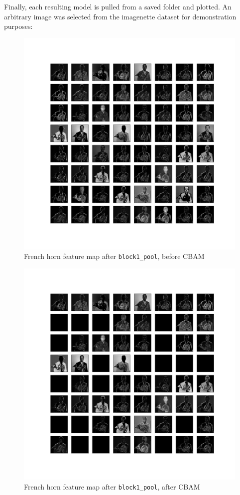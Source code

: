 \documentclass{article}
\begin{document}
Finally, each resulting model is pulled from a saved folder and plotted.
An arbitrary image was selected from the imagenette dataset for demonstration purposes:

\begin{figure}[H]
    \centering
    \includegraphics[width=6in]{csci-8920/hw-4/images/horn-pre-CBAM-3-block1_pool.png}
    \caption{French horn feature map after \lstinline{block1_pool}, before CBAM}
    \label{fig:horn_1_pre}
\end{figure}

\begin{figure}[H]
    \centering
    \includegraphics[width=6in]{csci-8920/hw-4/images/horn-post-CBAM-3-block1_pool.png}
    \caption{French horn feature map after \lstinline{block1_pool}, after CBAM}
    \label{fig:horn_1_post}
\end{figure}
\end{document}
